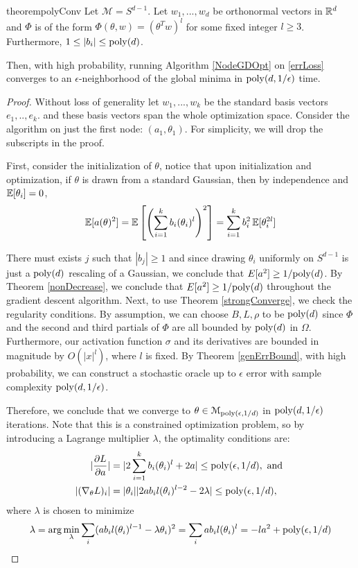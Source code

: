 \begin{restatable}{theorem}{polyConv}
\label{PolyConv}
Let $\mathcal{M} = S^{d-1}$. Let $w_1,...,w_d$ be orthonormal vectors in ${\mathbb{R}}^d$ and $\Phi$ is of the form $\Phi(\theta,w) = (\theta^Tw)^l$ for some fixed integer $l \geq 3$. Furthermore, $1 \leq |b_i|\leq \mathrm{poly}(d)$. 

Then, with high probability, running Algorithm \ref{NodeGDOpt} on \eqref{errLoss} converges to an $\epsilon$-neighborhood of the global minima in $\mathrm{poly}(d,1/\epsilon)$ time. 
\end{restatable}


\begin{proof}
Without loss of generality let $w_1,...,w_k$ be the standard basis vectors $e_1,..,e_k$. and these basis vectors span the whole optimization space. Consider the algorithm on just the first node: $(a_1,\theta_1)$. For simplicity, we will drop the subscripts in the proof. 

First, consider the initialization of $\theta$, notice that upon initialization and optimization, if $\theta$ is drawn from a standard Gaussian, then by independence and $\operatorname*{\mathbb{E}}[\theta_i] = 0$,
%
\[\operatorname*{\mathbb{E}}[a(\theta)^2] = \operatorname*{\mathbb{E}}\left[\left(\sum_{i=1}^k  b_i (\theta_i)^l\right)^2\right] = \sum_{i=1}^k b_i^2 \operatorname*{\mathbb{E}}[\theta_i^{2l}]\]

There must exists $j$ such that $|b_j|\geq 1$ and since drawing $\theta_i$ uniformly on $S^{d-1}$ is just a $\mathrm{poly}(d)$ rescaling of a Gaussian, we conclude that $E[a^2]\geq1/\mathrm{poly}(d)$. By Theorem \ref{nonDecrease}, we conclude that $E[a^2] \geq 1/\mathrm{poly}(d)$ throughout the gradient descent algorithm. Next, to use Theorem \ref{strongConverge}, we check the regularity conditions. By assumption, we can choose $B, L, \rho$ to be $\mathrm{poly}(d)$ since $\Phi$ and the second and third partials of $\Phi$ are all bounded by $\mathrm{poly}(d)$ in $\Omega$. Furthermore, our activation function $\sigma$ and its derivatives are bounded in magnitude by $O(|x|^{l})$, where $l$ is fixed. By Theorem \ref{genErrBound}, with high probability, we can construct a stochastic oracle up to $\epsilon$ error with sample complexity $\mathrm{poly}(d,1/\epsilon)$.


Therefore, we conclude that we converge to $\theta \in \mathcal{M}_{\mathrm{poly}(\epsilon,1/d)}$ in $\mathrm{poly}(d,1/\epsilon)$ iterations. Note that this is a constrained optimization problem, so by introducing a Lagrange multiplier $\lambda$, the optimality conditions are:
%
\begin{align*}
|\pd{L}{a}| & = |2\sum_{i=1}^k b_i (\theta_i)^l + 2a| \leq \poly(\epsilon,1/d), \textrm{ and } \\
%
 |(\nabla_\theta L)_i| & = |\theta_i||2ab_il(\theta_i)^{l-2}  -2\lambda| \leq \poly(\epsilon,1/d) ,
\end{align*}
where $\lambda$ is chosen to minimize
\[\lambda = \arg \min_\lambda \sum_i (ab_i l (\theta_i)^{l-1} - \lambda\theta_i)^2 = \sum_i ab_i l (\theta_i)^l = -la^2 + \mathrm{poly}(\epsilon,1/d) \]


\end{proof}
